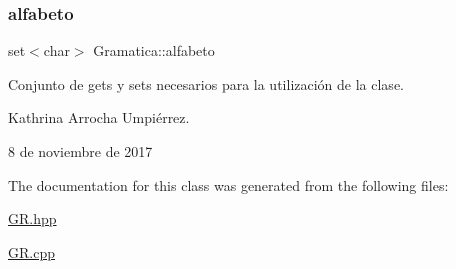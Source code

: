 \subsubsection{\texorpdfstring{alfabeto}{alfabeto}}
{\footnotesize\ttfamily set$<$char$>$ Gramatica\+::alfabeto}

Conjunto de gets y sets necesarios para la utilización de la clase.

Kathrina Arrocha Umpiérrez.

8 de noviembre de 2017 

The documentation for this class was generated from the following files\+:\begin{DoxyCompactItemize}
\item 
\hyperlink{_g_r_8hpp}{G\+R.\+hpp}\item 
\hyperlink{_g_r_8cpp}{G\+R.\+cpp}\end{DoxyCompactItemize}
